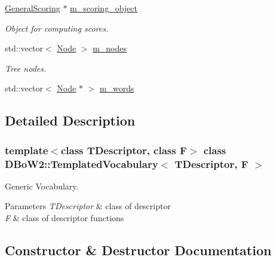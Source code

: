 \begin{DoxyCompactItemize}
\hyperlink{classDBoW2_1_1GeneralScoring}{General\+Scoring} $\ast$ \hyperlink{classDBoW2_1_1TemplatedVocabulary_a34144d0e2056d6ed8b925a2937b67418}{m\+\_\+scoring\+\_\+object}
\begin{DoxyCompactList}\small\item\em Object for computing scores. \end{DoxyCompactList}\item 
\mbox{\label{classDBoW2_1_1TemplatedVocabulary_a82be6d310eae6f4f57a72d340489320b}} 
std\+::vector$<$ \hyperlink{structDBoW2_1_1TemplatedVocabulary_1_1Node}{Node} $>$ \hyperlink{classDBoW2_1_1TemplatedVocabulary_a82be6d310eae6f4f57a72d340489320b}{m\+\_\+nodes}
\begin{DoxyCompactList}\small\item\em Tree nodes. \end{DoxyCompactList}\item 
std\+::vector$<$ \hyperlink{structDBoW2_1_1TemplatedVocabulary_1_1Node}{Node} $\ast$ $>$ \hyperlink{classDBoW2_1_1TemplatedVocabulary_a1665546b54f954d2d54d59a6982df3ca}{m\+\_\+words}
\end{DoxyCompactItemize}


\subsection{Detailed Description}
\subsubsection*{template$<$class T\+Descriptor, class F$>$\newline
class D\+Bo\+W2\+::\+Templated\+Vocabulary$<$ T\+Descriptor, F $>$}

Generic Vocabulary. 


\begin{DoxyParams}{Parameters}
{\em T\+Descriptor} & class of descriptor \\
\hline
{\em F} & class of descriptor functions \\
\hline
\end{DoxyParams}


\subsection{Constructor \& Destructor Documentation}
\mbox{\label{classDBoW2_1_1TemplatedVocabulary_a0dbbcb6bf766b09f08d945a2af0dbea8}} 
